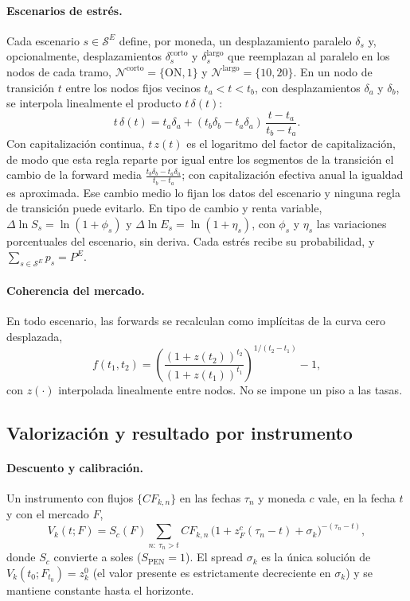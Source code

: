 \paragraph{Escenarios de estrés.} Cada escenario $s \in \mathcal{S}^E$ define, por moneda, un
desplazamiento paralelo $\delta_s$ y, opcionalmente, desplazamientos $\delta_s^{\text{corto}}$ y
$\delta_s^{\text{largo}}$ que reemplazan al paralelo en los nodos de cada tramo,
$\mathcal{N}^{\text{corto}} = \{\text{ON}, 1\}$ y $\mathcal{N}^{\text{largo}} = \{10, 20\}$. En un nodo de
transición $t$ entre los nodos fijos vecinos $t_a < t < t_b$, con desplazamientos $\delta_a$ y $\delta_b$, se
interpola linealmente el producto $t\,\delta(t)$:
\begin{equation}
  t\,\delta(t) = t_a \delta_a + (t_b \delta_b - t_a \delta_a)\,\frac{t - t_a}{t_b - t_a}.
\end{equation}
Con capitalización continua, $t\,z(t)$ es el logaritmo del factor de capitalización, de modo que esta regla
reparte por igual entre los segmentos de la transición el cambio de la forward media
$\frac{t_b \delta_b - t_a \delta_a}{t_b - t_a}$; con capitalización efectiva anual la igualdad es aproximada.
Ese cambio medio lo fijan los datos del escenario y ninguna regla de transición puede evitarlo. En tipo de
cambio y renta variable, $\Delta \ln S_s = \ln(1 + \phi_s)$ y $\Delta \ln E_s = \ln(1 + \eta_s)$, con
$\phi_s$ y $\eta_s$ las variaciones porcentuales del escenario, sin deriva. Cada estrés recibe su
probabilidad, y $\sum_{s \in \mathcal{S}^E} p_s = P^E$.

\paragraph{Coherencia del mercado.} En todo escenario, las forwards se recalculan como implícitas de la
curva cero desplazada,
\[
  f(t_1, t_2) = \left(\frac{(1 + z(t_2))^{t_2}}{(1 + z(t_1))^{t_1}}\right)^{1/(t_2 - t_1)} - 1,
\]
con $z(\cdot)$ interpolada linealmente entre nodos. No se impone un piso a las tasas.

\subsection{Valorización y resultado por instrumento}\label{app:form-revalorizacion}
\paragraph{Descuento y calibración.} Un instrumento con flujos $\{CF_{k,n}\}$ en las fechas $\tau_n$ y moneda
$c$ vale, en la fecha $t$ y con el mercado $F$,
\[
  V_k(t; F) = S_c(F) \sum_{n:\ \tau_n > t} CF_{k,n}\,\big(1 + z^{c}_F(\tau_n - t) + \sigma_k\big)^{-(\tau_n - t)},
\]
donde $S_c$ convierte a soles ($S_{\text{PEN}} = 1$). El spread $\sigma_k$ es la única solución de
$V_k(t_0; F_{t_0}) = z_k^0$ (el valor presente es estrictamente decreciente en $\sigma_k$) y se mantiene
constante hasta el horizonte.

